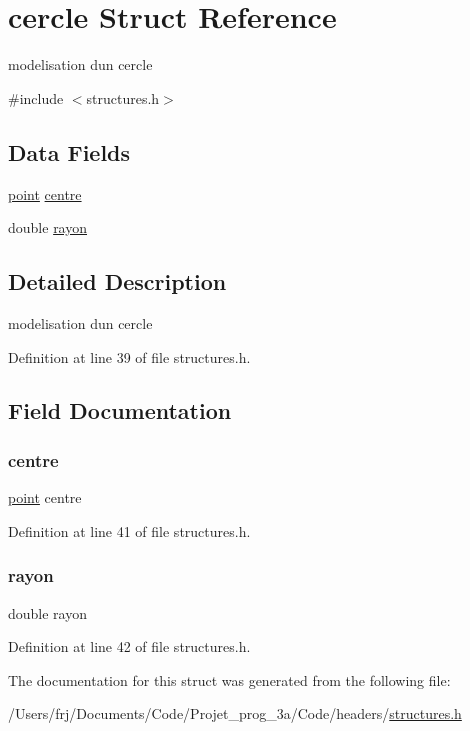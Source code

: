 \hypertarget{structcercle}{}\section{cercle Struct Reference}
\label{structcercle}


modelisation d\textquotesingle{}un cercle  




{\ttfamily \#include $<$structures.\+h$>$}

\subsection*{Data Fields}
\begin{DoxyCompactItemize}
\item 
\hyperlink{structpoint}{point} \hyperlink{structcercle_a9c1fef0a1dbe602bb367f77511d36b3d}{centre}
\item 
double \hyperlink{structcercle_a2459aedac9f8646ad9566164a9a83f41}{rayon}
\end{DoxyCompactItemize}


\subsection{Detailed Description}
modelisation d\textquotesingle{}un cercle 

Definition at line 39 of file structures.\+h.



\subsection{Field Documentation}
\hypertarget{structcercle_a9c1fef0a1dbe602bb367f77511d36b3d}{}\label{structcercle_a9c1fef0a1dbe602bb367f77511d36b3d} 
\subsubsection{\texorpdfstring{centre}{centre}}
{\footnotesize\ttfamily \hyperlink{structpoint}{point} centre}



Definition at line 41 of file structures.\+h.

\hypertarget{structcercle_a2459aedac9f8646ad9566164a9a83f41}{}\label{structcercle_a2459aedac9f8646ad9566164a9a83f41} 
\subsubsection{\texorpdfstring{rayon}{rayon}}
{\footnotesize\ttfamily double rayon}



Definition at line 42 of file structures.\+h.



The documentation for this struct was generated from the following file\+:\begin{DoxyCompactItemize}
\item 
/\+Users/frj/\+Documents/\+Code/\+Projet\+\_\+prog\+\_\+3a/\+Code/headers/\hyperlink{structures_8h}{structures.\+h}\end{DoxyCompactItemize}
